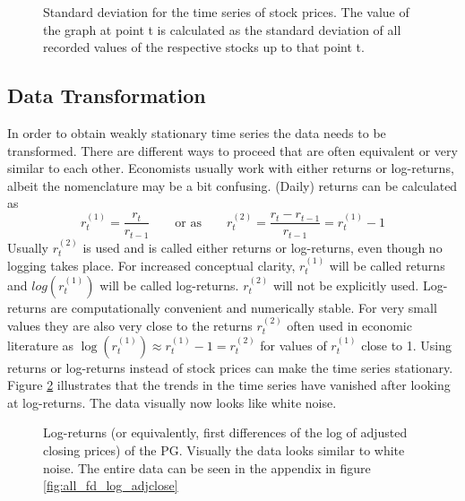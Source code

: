 \begin{figure}[H]
    \centering
    \begin{adjustbox}{width=.9\textwidth,center}
    
    \end{adjustbox}  
    \caption{Standard deviation for the time series of stock prices. The value of the graph at point t is calculated as the standard deviation of all recorded values of the respective stocks up to that point t.}
    \label{fig:cum_sd_all}
\end{figure}{}

\subsection{Data Transformation}

In order to obtain weakly stationary time series the data needs to be transformed. There are different ways to proceed that are often equivalent or very similar to each other. Economists usually work with either returns or log-returns, albeit the nomenclature may be a bit confusing. (Daily) returns can be calculated as
\begin{equation*}
    r^{\scriptscriptstyle{(1)} }_t = \frac{r_t}{r_{t-1}} \qquad \text{or as} \qquad r^{\scriptscriptstyle{(2)}}_t = \frac{r_t - r_{t-1}}{r_{t-1}} = r^{\scriptscriptstyle{(1)}}_t - 1
\end{equation*}{}
Usually $r^{\scriptscriptstyle{(2)}}_t$ is used and is called either returns or log-returns, even though no logging takes place. For increased conceptual clarity, $r^{\scriptscriptstyle{(1)}}_t$ will be called returns and $log(r^{\scriptscriptstyle{(1)}}_t)$ will be called log-returns. $r^{\scriptscriptstyle{(2)}}_t$ will not be explicitly used. Log-returns are computationally convenient and numerically stable. For very small values they are also very close to the returns $r^{\scriptscriptstyle{(2)}}_t$ often used in economic literature as $ \log(r^{\scriptscriptstyle{(1)}}_t) \approx r^{\scriptscriptstyle{(1)}}_t - 1 = r^{\scriptscriptstyle{(2)}}_t$ for values of $r^{\scriptscriptstyle{(1)}}_t$ close to 1. Using returns or log-returns instead of stock prices can make the time series stationary. Figure \ref{fig:PG_fd_log_adjclose} illustrates that the trends in the time series have vanished after looking at log-returns. The data visually now looks like white noise. 

\begin{figure}[H]
    \centering
    \begin{adjustbox}{width=.9\textwidth,center}
    
    \end{adjustbox}  
    \caption{Log-returns (or equivalently, first differences of the log of adjusted closing prices) of the PG. Visually the data looks similar to white noise. The entire data can be seen in the appendix in figure \ref{fig:all_fd_log_adjclose}}
    \label{fig:PG_fd_log_adjclose}
\end{figure}{}

